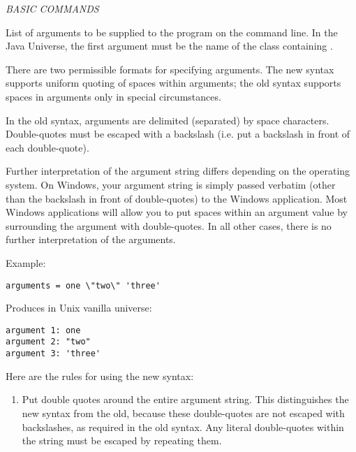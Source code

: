 \emph{BASIC COMMANDS}
\begin{description} 


\item[arguments = $<$argument\_list$>$]
\label{man-condor-submit-arguments}
List of arguments to be supplied
to the program on the command line.   In the Java Universe, the first
argument must be the name of the class containing .

There are two permissible formats for specifying arguments.  The new
syntax supports uniform quoting of spaces within arguments; the old
syntax supports spaces in arguments only in special circumstances.

In the old syntax, arguments are delimited (separated) by space
characters.  Double-quotes must be escaped with a backslash (i.e. put
a backslash in front of each double-quote).

Further interpretation of the argument string differs depending on the
operating system.  On Windows, your argument string is
simply passed verbatim (other than the backslash in front of
double-quotes) to the Windows application.  Most Windows applications
will allow you to put spaces within an argument value by surrounding
the argument with double-quotes.
In all
other cases, there is no further interpretation of the arguments.

Example:

\begin{verbatim}
arguments = one \"two\" 'three'
\end{verbatim}

Produces in Unix vanilla universe:

\begin{verbatim}
argument 1: one
argument 2: "two"
argument 3: 'three'
\end{verbatim}

Here are the rules for using the new syntax:

\begin{enumerate}

\item Put double quotes around the entire argument string.  This
distinguishes the new syntax from the old, because these double-quotes
are not escaped with backslashes, as required in the old syntax.  Any
literal double-quotes within the string must be escaped by repeating
them.


\end{enumerate}
\end{description}
